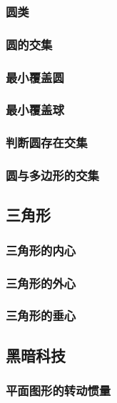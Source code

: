 \documentclass[a4paper]{article}
\begin{document}
\subsubsection{圆类}

\subsubsection{圆的交集}

\subsubsection{最小覆盖圆}

\subsubsection{最小覆盖球}

\subsubsection{判断圆存在交集}

\subsubsection{圆与多边形的交集}

\subsection{三角形}

\subsubsection{三角形的内心}

\subsubsection{三角形的外心}

\subsubsection{三角形的垂心}

\subsection{黑暗科技}

\subsubsection{平面图形的转动惯量}
\end{document}
